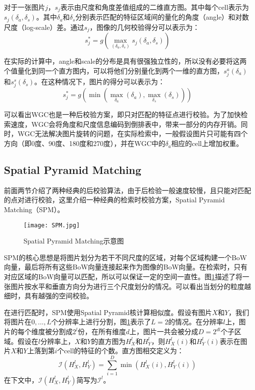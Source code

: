 对于一张图片$j$，$s_j$表示由尺度和角度差值组成的二维直方图。其中每个cell表示为$s_j(\delta_a,\delta_s)$。其中$\delta_a$和$\delta_s$分别表示匹配的特征区域间的量化的角度（angle）和对数尺度（log-scale）差。通过$s_j$，图像的几何校验得分可以表示为：
\begin{equation}
s_j^*=g( \max \limits_{(\delta_a,\delta_s)} s_j(\delta_a,\delta_s) )
\end{equation}

在实际的计算中，angle和scale的分布是具有很强独立性的，所以没有必要将这两个值量化到同一个直方图内，可以将他们分别量化到两个一维的直方图，$s_j^a(\delta_a)$和$s_j^s(\delta_s)$。在这种情况下，图片的得分可以表示为：
\begin{equation}
s_j^*=g( \min (\max \limits_{\delta_a}(\delta_a), \max \limits_{\delta_s}(\delta_s)) )
\end{equation}

可以看出WGC也是一种后校验方案，即只对匹配的特征点进行校验。为了加快检索速度，WGC会将角度和尺度信息编码到倒排表中，带来一部分的内存开销。同时，WGC无法解决图片旋转的问题，在实际检索中，一般假设图片只可能有四个方向（即0度、90度、180度和270度），并在WGC中的$\delta_a$相应的cell上增加权重。

\subsection{Spatial Pyramid Matching}
前面两节介绍了两种经典的后校验算法，由于后检验一般速度较慢，且只能对匹配的点对进行校验，这里介绍一种经典的检索时校验方案，Spatial Pyramid Matching（SPM）\cite{lazebnik2006beyond}。
\begin{figure}[h]
	\centering
	\texttt{[image: SPM.jpg]}
	\caption{Spatial Pyramid Matching示意图}\label{fig:SPM}
\end{figure}

SPM的核心思想是将图片划分为若干不同尺度的区域，对每个区域构建一个BoW向量，最后将所有这些BoW向量连接起来作为图像的BoW向量。在检索时，只有对应区域的BoW向量可以匹配，所以可以保证一定的空间一直性。图\ref{fig:SPM}描述了将一张图片按水平和垂直方向分为进行三个尺度划分的情况。可以看出当划分的粒度越细时，具有越强的空间校验。

在进行匹配时，SPM使用Spatial Pyramid核计算相似度。假设有图片$X$和$Y$，我们将图片在$0,...,L$个分辨率上进行分割，图\ref{fig:SPM}表示了$L=2$的情况。在分辨率$l$上，图片的每个维度被分割成$2^l$份，在所有维度$d$上，图片一共会被分成$D=2^{dl}$个子区域。假设在$l$分辨率上，$X$和$Y$的直方图为$H_X^l$和$H_Y^l$，则$H_X^l(i)$和$H_Y^l(i)$表示在图片$X$和$Y$上落到第$i$个cell的特征的个数。直方图相交定义为：
\begin{equation}
\mathcal{I}(H_X^l, H_Y^l) = \sum_{i=1}^{D} \min(H_X^l(i), H_Y^l(i))
\end{equation}
在下文中，$\mathcal{I}(H_X^l, H_Y^l)$简写为$\mathcal{I}^l$。

